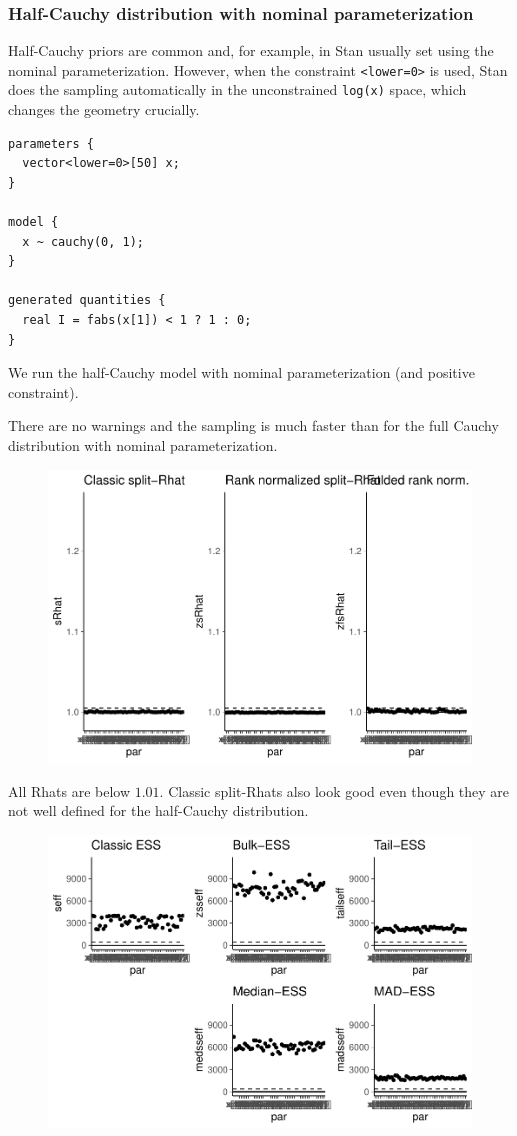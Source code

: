\documentclass[american,]{article}
\begin{document}
\hypertarget{half-cauchy-distribution-with-nominal-parameterization}{%
\subsubsection*{Half-Cauchy distribution with nominal
parameterization}\label{half-cauchy-distribution-with-nominal-parameterization}}

Half-Cauchy priors are common and, for example, in Stan usually set
using the nominal parameterization. However, when the constraint
\texttt{\textless{}lower=0\textgreater{}} is used, Stan does the
sampling automatically in the unconstrained \texttt{log(x)} space, which
changes the geometry crucially.

\begin{verbatim}
parameters {
  vector<lower=0>[50] x;
}

model {
  x ~ cauchy(0, 1);
}

generated quantities {
  real I = fabs(x[1]) < 1 ? 1 : 0;
}
\end{verbatim}

We run the half-Cauchy model with nominal parameterization (and positive
constraint).

There are no warnings and the sampling is much faster than for the full
Cauchy distribution with nominal parameterization.

\begin{figure}[tp]
  \centering
  \includegraphics[width=0.6\linewidth]{graphics/rhat-fit-half-nom-1.pdf}
\end{figure}

All Rhats are below \(1.01\). Classic split-Rhats also look good even
though they are not well defined for the half-Cauchy distribution.

\begin{figure}[tp]
  \centering
  \includegraphics[width=0.6\linewidth]{graphics/ess-fit-half-nom-1.pdf}
\end{figure}
\end{document}
